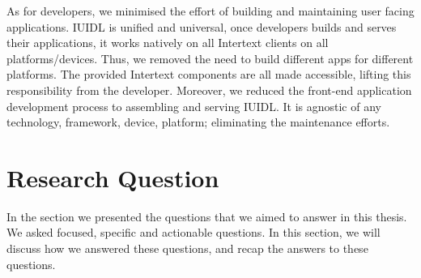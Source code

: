 As for developers, we minimised the effort of building and maintaining user facing applications. IUIDL is unified and universal, once developers builds and serves their applications, it works natively on all Intertext clients on all platforms/devices. Thus, we removed the need to build different apps for different platforms. The provided Intertext components are all made accessible, lifting this responsibility from the developer. Moreover, we reduced the front-end application development process to assembling and serving IUIDL. It is agnostic of any technology, framework, device, platform; eliminating the maintenance efforts.

\section{Research Question}

In the  section we presented the questions that we aimed to answer in this thesis. We asked focused, specific and actionable questions. In this section, we will discuss how we answered these questions, and recap the answers to these questions.

